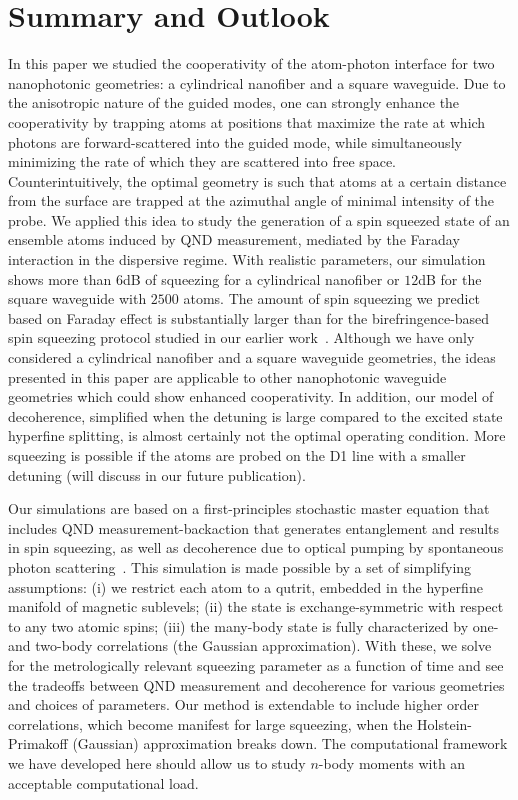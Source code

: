 \documentclass[aps,pra,twocolumn,superscriptaddress]{revtex4-1} %
\begin{document}
\section{Summary and Outlook}
In this paper we studied the cooperativity of the atom-photon interface for two nanophotonic geometries: a cylindrical nanofiber and a square waveguide.  Due to the anisotropic nature of the guided modes, one can strongly enhance the cooperativity by trapping atoms at positions that maximize the rate at which photons are forward-scattered  into the guided mode, while simultaneously minimizing the rate of which they are scattered into free space.  Counterintuitively, the optimal geometry is such that atoms at a certain distance from the surface are trapped at the azimuthal angle of minimal intensity of the probe.  We applied this idea to study the generation of a spin squeezed state of an ensemble atoms induced by QND measurement, mediated by the Faraday interaction in the dispersive regime. 
With realistic parameters, our simulation shows more than $ 6 $dB of squeezing for a cylindrical nanofiber or $ 12 $dB for the square waveguide with $ 2500 $ atoms. The amount of spin squeezing we predict based on Faraday effect is substantially larger than for the birefringence-based spin squeezing protocol studied in our earlier work~\cite{Qi2016}.  Although we have only considered a cylindrical nanofiber and a square waveguide geometries, the ideas presented in this paper are applicable to other nanophotonic waveguide geometries which could show enhanced cooperativity.  In addition, our model of decoherence, simplified when the detuning is large compared to the excited state hyperfine splitting, is almost certainly not the optimal operating condition. More squeezing is possible if the atoms are probed on the D1 line with a smaller detuning (will discuss in our future publication).

Our simulations are based on a first-principles stochastic master equation that includes QND measurement-backaction that generates entanglement and results in spin squeezing, as well as decoherence due to optical pumping by spontaneous photon scattering~\cite{Norris2014, Baragiola2014, Qi2016}. This simulation is made possible by a set of simplifying assumptions: (i) we restrict each atom to a qutrit, embedded in the hyperfine manifold of magnetic sublevels; (ii) the state is exchange-symmetric with respect to any two atomic spins; (iii) the many-body state is fully characterized by one- and two-body correlations (the Gaussian approximation).   With these, we solve for the metrologically relevant squeezing parameter as a function of time and see the tradeoffs between QND measurement and decoherence for various geometries and choices of parameters.  Our method is extendable to include higher order correlations, which become manifest for large squeezing, when the Holstein-Primakoff (Gaussian) approximation breaks down.  The computational framework we have developed here should allow us to study $n$-body moments with an acceptable computational load. 
\end{document}
